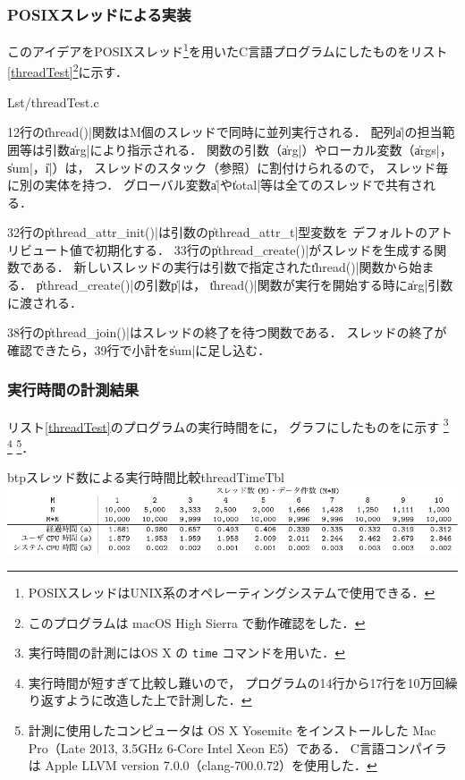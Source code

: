 \subsubsection{POSIXスレッドによる実装}
このアイデアをPOSIXスレッド\footnote{
  POSIXスレッドはUNIX系のオペレーティングシステムで使用できる．
}を用いたC言語プログラムにしたものをリスト\ref{threadTest}\footnote{
  このプログラムは macOS High Sierra で動作確認をした．
}に示す．


  {Lst/threadTest.c}

12行の\|thread()|関数はM個のスレッドで同時に並列実行される．
配列\|a|の担当範囲等は引数\|arg|により指示される．
関数の引数（\|arg|）やローカル変数（\|args|，\|sum|，\|i|）は，
スレッドのスタック（参照）に割付けられるので，
スレッド毎に別の実体を持つ．
グローバル変数\|a|や\|total|等は全てのスレッドで共有される．

32行の\|pthread_attr_init()|は引数の\|pthread_attr_t|型変数を
デフォルトのアトリビュート値で初期化する．
33行の\|pthread_create()|がスレッドを生成する関数である．
新しいスレッドの実行は引数で指定された\|thread()|関数から始まる．
\|pthread_create()|の引数\|p|は，
\|thread()|関数が実行を開始する時に\|arg|引数に渡される．

38行の\|pthread_join()|はスレッドの終了を待つ関数である．
スレッドの終了が確認できたら，39行で小計を\|sum|に足し込む．

\subsubsection{実行時間の計測結果}
リスト\ref{threadTest}のプログラムの実行時間をに，
グラフにしたものをに示す
\footnote{
  実行時間の計測にはOS X の \texttt{time} コマンドを用いた．
}
\footnote{
  実行時間が短すぎて比較し難いので，
  プログラムの14行から17行を10万回繰り返すように改造した上で計測した．}
\footnote{
  計測に使用したコンピュータは
  OS X Yosemite をインストールした
  Mac Pro（Late 2013, 3.5GHz 6-Core Intel Xeon E5）である．
  C言語コンパイラは
  Apple LLVM version 7.0.0（clang-700.0.72）を使用した．
}．

\begin{mytable}{btp}{スレッド数による実行時間比較}{threadTimeTbl}
  \includegraphics[scale=1.0]{Tbl/threadTimeTbl.pdf}
\end{mytable}

